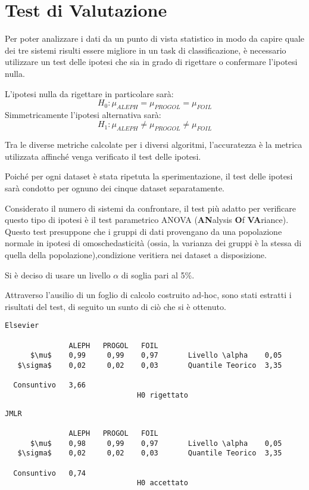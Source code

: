 \section{Test di Valutazione}
Per poter analizzare i dati da un punto di vista statistico in modo da capire quale dei tre sistemi risulti essere migliore in un task di classificazione, è necessario utilizzare un test delle ipotesi che sia in grado di rigettare o confermare l'ipotesi nulla.

L'ipotesi nulla da rigettare in particolare sarà:
$$H_0 : \mu_{ALEPH} = \mu_{PROGOL} = \mu_{FOIL} $$
Simmetricamente l'ipotesi alternativa sarà:
$$H_1 : \mu_{ALEPH} \neq \mu_{PROGOL} \neq \mu_{FOIL} $$

Tra le diverse metriche calcolate per i diversi algoritmi, l'accuratezza è la metrica utilizzata affinché venga verificato il test delle ipotesi.

Poiché per ogni dataset è stata ripetuta la sperimentazione, il test delle ipotesi sarà condotto per ognuno dei cinque dataset separatamente.

Considerato il numero di sistemi da confrontare, il test più adatto per verificare questo tipo di ipotesi è il test parametrico ANOVA (\textbf{AN}alysis \textbf{O}f \textbf{VA}riance). Questo test presuppone che i gruppi di dati provengano da una popolazione normale in ipotesi di omoschedasticità (ossia, la varianza dei gruppi è la stessa di quella della popolazione),condizione veritiera nei dataset a disposizione. 

Si è deciso di usare un livello $\alpha$ di soglia pari al 5\%.

Attraverso l'ausilio di un foglio di calcolo costruito ad-hoc, sono stati estratti i risultati del test, di seguito un sunto di ciò che si è ottenuto.

\begin{verbatim}
Elsevier

               ALEPH   PROGOL   FOIL
      $\mu$    0,99     0,99    0,97       Livello \alpha    0,05
   $\sigma$    0,02     0,02    0,03       Quantile Teorico  3,35
     
  Consuntivo   3,66
                               H0 rigettato
\end{verbatim}

\begin{verbatim}
JMLR

               ALEPH   PROGOL   FOIL
      $\mu$    0,98     0,99    0,97       Livello \alpha    0,05
   $\sigma$    0,02     0,02    0,03       Quantile Teorico  3,35
     
  Consuntivo   0,74
                               H0 accettato
\end{verbatim}

